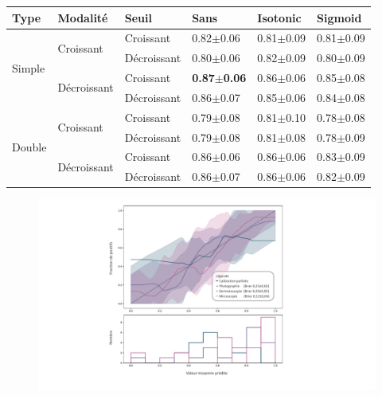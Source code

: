 \begin{table}[H]
    \begin{tabular}{llllll}
        \toprule 
        Type                    & Modalité                          & Seuil             & Sans                  & Isotonic              & Sigmoid               \\ \midrule
        \multirow{4}{*}{Simple} & \multirow{2}{*}{Croissant}        & Croissant         & 0.82$\pm$0.06         & 0.81$\pm$0.09         & 0.81$\pm$0.09         \\ \cline{3-6}
                                &                                   & Décroissant       & 0.80$\pm$0.06         & 0.82$\pm$0.09         & 0.80$\pm$0.09         \\ \cline{2-6}
                                & \multirow{2}{*}{Décroissant}      & Croissant         & \textbf{0.87$\pm$0.06}& 0.86$\pm$0.06         & 0.85$\pm$0.08         \\ \cline{3-6}
                                &                                   & Décroissant       & 0.86$\pm$0.07         & 0.85$\pm$0.06         & 0.84$\pm$0.08         \\ \cline{1-6}
        \multirow{4}{*}{Double} & \multirow{2}{*}{Croissant}        & Croissant         & 0.79$\pm$0.08         & 0.81$\pm$0.10         & 0.78$\pm$0.08         \\ \cline{3-6}
                                &                                   & Décroissant       & 0.79$\pm$0.08         & 0.81$\pm$0.08         & 0.78$\pm$0.09         \\ \cline{2-6}
                                & \multirow{2}{*}{Décroissant}      & Croissant         & 0.86$\pm$0.06         & 0.86$\pm$0.06         & 0.83$\pm$0.09         \\ \cline{3-6}
                                &                                   & Décroissant       & 0.86$\pm$0.07         & 0.86$\pm$0.06         & 0.82$\pm$0.09         \\ \bottomrule
    \end{tabular}
\end{table}

\begin{figure}[H]
    \centering
    \includegraphics[width=\linewidth]{contents/chapter_8/resources/results_calibration_sequential.pdf}
    \caption{}
    \label{fig:results_calibration_sequential}
\end{figure}\par

